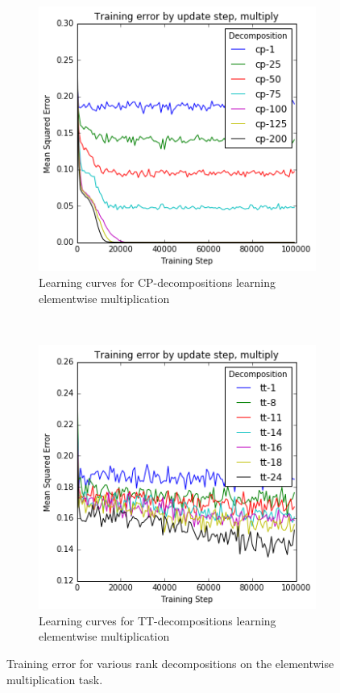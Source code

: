 {\begin{figure}
	\begin{subfigure}[t]{0.45\textwidth}
		\includegraphics[width=\textwidth]{tensors/multiply-cp-mom}
		\caption{Learning curves for CP-decompositions learning elementwise multiplication}
	\end{subfigure}
	~
	\begin{subfigure}[t]{0.45\textwidth}
		\includegraphics[width=\textwidth]{tensors/multiply-tt-mom}
		\caption{Learning curves for TT-decompositions learning elementwise multiplication}
	\end{subfigure}
	\caption{Training error for various rank decompositions on the elementwise multiplication
	task.}
	\label{fig:multiply-ff}
\end{figure}

}
